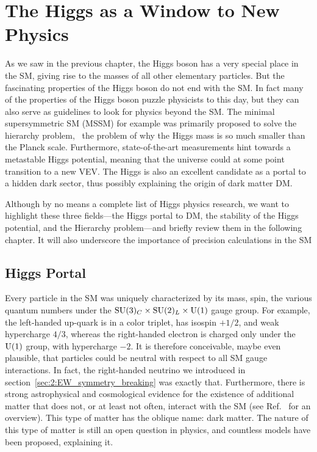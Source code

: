 
\chapter{The Higgs as a Window to New Physics}\label{chap:three}

As we saw in the previous chapter, the Higgs boson has a very special place in the \acs{SM}, giving rise to the masses of all other elementary particles. But the fascinating properties of the Higgs boson do not end with the \acs{SM}. In fact many of the properties of the Higgs boson puzzle physicists to this day, but they can also serve as guidelines to look for physics beyond the \acs{SM}. The minimal supersymmetric \acs{SM} (\acs{MSSM}) for example was primarily proposed to solve the hierarchy problem, \ie\ the problem of why the Higgs mass is so much smaller than the Planck scale. Furthermore, state-of-the-art measurements hint towards a metastable Higgs potential, meaning that the universe could at some point transition to a new \acs{VEV}. The Higgs is also an excellent candidate as a portal to a hidden dark sector, thus possibly explaining the origin of dark matter \acs{DM}.

Although by no means a complete list of Higgs physics research, we want to highlight these three fields---the Higgs portal to \acs{DM}, the stability of the Higgs potential, and the Hierarchy problem---and briefly review them in the following chapter. It will also underscore the importance of precision calculations in the \acs{SM}

\section{Higgs Portal}
Every particle in the \acs{SM} was uniquely characterized by its mass, spin, the various quantum numbers under the $\mathrm{SU}(3)_C \times \mathrm{SU}(2)_L \times \mathrm{U}(1)$ gauge group. For example, the left-handed up-quark is in a color triplet, has isospin $+1/2$, and weak hypercharge $4/3$, whereas the right-handed electron is charged only under the $\mathrm{U}(1)$ group, with hypercharge $-2$. It is therefore conceivable, maybe even plausible, that particles could be neutral with respect to all \acs{SM} gauge interactions. In fact, the right-handed neutrino we introduced in section~\ref{sec:2:EW_symmetry_breaking} was exactly that. Furthermore, there is strong astrophysical and cosmological evidence for the existence of additional matter that does not, or at least not often, interact with the \acs{SM} (see Ref.~\cite{Cirelli:2024ssz} for an overview). This type of matter has the oblique name: dark matter. The nature of this type of matter is still an open question in physics, and countless models have been proposed, explaining it.

